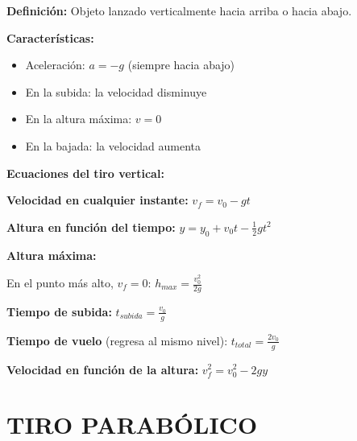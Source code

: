 \begin{seccion}

\begin{definicion}
    \textbf{Definición:} Objeto lanzado verticalmente hacia arriba o hacia abajo.
\end{definicion}

\vspace{0.3cm}

\textbf{Características:}
\begin{itemize}
    \item Aceleración: $a = -g$ (siempre hacia abajo)
    \item En la subida: la velocidad disminuye
    \item En la altura máxima: $v = 0$
    \item En la bajada: la velocidad aumenta
\end{itemize}

\begin{ecuacion}
\textbf{Ecuaciones del tiro vertical:}

\textbf{Velocidad en cualquier instante:}
$v_f = v_0 - gt$

\textbf{Altura en función del tiempo:}
$y = y_0 + v_0 t - \frac{1}{2}gt^2$

\textbf{Altura máxima:}

En el punto más alto, $v_f = 0$:
$h_{max} = \frac{v_0^2}{2g}$

\textbf{Tiempo de subida:}
$t_{subida} = \frac{v_0}{g}$

\textbf{Tiempo de vuelo} (regresa al mismo nivel):
$t_{total} = \frac{2v_0}{g}$

\textbf{Velocidad en función de la altura:}
$v_f^2 = v_0^2 - 2gy$
\end{ecuacion}
\end{seccion}

\newpage

\section{TIRO PARABÓLICO}

